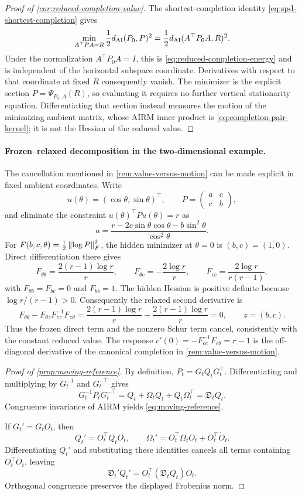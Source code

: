 \begin{proof}[Proof of \cref{cor:reduced-completion-value}]
The shortest-completion identity \eqref{eq:spd-shortest-completion} gives
\[
  \min_{A^\top PA=R}\frac12d_{\mathrm{AI}}(P_0,P)^2
  =\frac12d_{\mathrm{AI}}(A^\top P_0A,R)^2.
\]
Under the normalization \(A^\top P_0A=I\), this is
\eqref{eq:reduced-completion-energy} and is independent of the horizontal
subspace coordinate.  Derivatives with respect to that coordinate at fixed
\(R\) consequently vanish.  The minimizer is the explicit section
\(P=\Psi_{P_0,A}(R)\), so evaluating it requires no further vertical
stationarity equation.  Differentiating that section instead measures the
motion of the minimizing ambient matrix, whose AIRM inner product is
\eqref{eq:completion-pair-kernel}; it is not the Hessian of the reduced value.
\end{proof}

\paragraph{Frozen--relaxed decomposition in the two-dimensional example.}
The cancellation mentioned in \cref{rem:value-versus-motion} can be made
explicit in fixed ambient coordinates.  Write
\[
  u(\theta)=(\cos\theta,\sin\theta)^\top,
  \qquad
  P=\begin{pmatrix}a&c\\c&b\end{pmatrix},
\]
and eliminate the constraint \(u(\theta)^\top Pu(\theta)=r\) as
\[
  a=
  \frac{r-2c\sin\theta\cos\theta-b\sin^2\theta}
       {\cos^2\theta}.
\]
For
\(F(b,c,\theta)=\tfrac12\left\lVert \log P\right\rVert_F^2\), the hidden minimizer at
\(\theta=0\) is \((b,c)=(1,0)\).  Direct differentiation there gives
\[
  F_{\theta\theta}=\frac{2(r-1)\log r}{r},
  \qquad
  F_{\theta c}=-\frac{2\log r}{r},
  \qquad
  F_{cc}=\frac{2\log r}{r(r-1)},
\]
with \(F_{\theta b}=F_{bc}=0\) and \(F_{bb}=1\).  The hidden Hessian is
positive definite because \(\log r/(r-1)>0\).  Consequently the relaxed
second derivative is
\[
  F_{\theta\theta}
  -F_{\theta z}F_{zz}^{-1}F_{z\theta}
  =\frac{2(r-1)\log r}{r}
  -\frac{2(r-1)\log r}{r}
  =0,
  \qquad z=(b,c).
\]
Thus the frozen direct term and the nonzero Schur term cancel, consistently
with the constant reduced value.  The response
\(c'(0)=-F_{cc}^{-1}F_{c\theta}=r-1\) is the off-diagonal derivative of the
canonical completion in \cref{rem:value-versus-motion}.

\begin{proof}[Proof of \cref{prop:moving-reference}]
By definition, \(P_t=G_tQ_tG_t^\top\).  Differentiating and multiplying by
\(G_t^{-1}\) and \(G_t^{-\top}\) gives
\[
  G_t^{-1}\dot P_tG_t^{-\top}
  =\dot Q_t+\Omega_tQ_t+Q_t\Omega_t^\top
  =\mathfrak D_tQ_t.
\]
Congruence invariance of AIRM yields \eqref{eq:moving-reference}.

If \(G_t'=G_tO_t\), then
\[
  Q_t'=O_t^\top Q_tO_t,
  \qquad
  \Omega_t'=O_t^\top\Omega_tO_t+O_t^\top\dot O_t.
\]
Differentiating \(Q_t'\) and substituting these identities cancels all terms
containing \(O_t^\top\dot O_t\), leaving
\[
  \mathfrak D_t'Q_t'=O_t^\top(\mathfrak D_tQ_t)O_t.
\]
Orthogonal congruence preserves the displayed Frobenius norm.
\end{proof}

